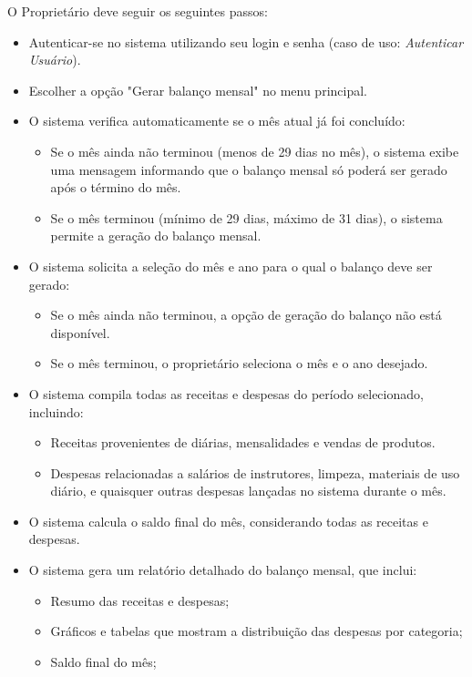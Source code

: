 O Proprietário deve seguir os seguintes passos:
\begin{itemize}
    \item Autenticar-se no sistema utilizando seu login e senha (caso de uso: \textit{Autenticar Usuário}).
    \item Escolher a opção "Gerar balanço mensal" no menu principal.
    \item O sistema verifica automaticamente se o mês atual já foi concluído:
    \begin{itemize}
        \item Se o mês ainda não terminou (menos de 29 dias no mês), o sistema exibe uma mensagem informando que o balanço mensal só poderá ser gerado após o término do mês.
        \item Se o mês terminou (mínimo de 29 dias, máximo de 31 dias), o sistema permite a geração do balanço mensal.
    \end{itemize}
    \item O sistema solicita a seleção do mês e ano para o qual o balanço deve ser gerado:
    \begin{itemize}
        \item Se o mês ainda não terminou, a opção de geração do balanço não está disponível.
        \item Se o mês terminou, o proprietário seleciona o mês e o ano desejado.
    \end{itemize}
    \item O sistema compila todas as receitas e despesas do período selecionado, incluindo:
    \begin{itemize}
        \item Receitas provenientes de diárias, mensalidades e vendas de produtos.
        \item Despesas relacionadas a salários de instrutores, limpeza, materiais de uso diário, e quaisquer outras despesas lançadas no sistema durante o mês.
    \end{itemize}
    \item O sistema calcula o saldo final do mês, considerando todas as receitas e despesas.
    \item O sistema gera um relatório detalhado do balanço mensal, que inclui:
    \begin{itemize}
        \item Resumo das receitas e despesas;
        \item Gráficos e tabelas que mostram a distribuição das despesas por categoria;
        \item Saldo final do mês;

\end{itemize}
\end{itemize}
